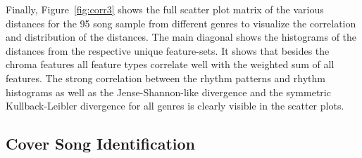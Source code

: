 \noindent Finally, Figure~\ref{fig:corr3} shows the full scatter plot matrix of the various distances for the 95 song sample from different genres to visualize the correlation and distribution of the distances. The main diagonal shows the histograms of the distances from the respective unique feature-sets. It shows that besides the chroma features all feature types correlate well with the weighted sum of all features. The strong correlation between the rhythm patterns and rhythm histograms as well as the Jense-Shannon-like divergence and the symmetric Kullback-Leibler divergence for all genres is clearly visible in the scatter plots. 

\begin{figure}[htbp]
	\centering
\end{figure}


\subsection{Cover Song Identification}\label{covsongid}

